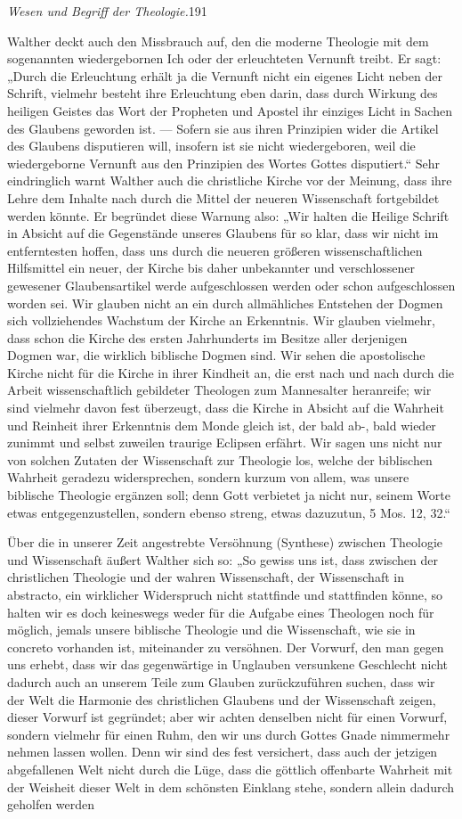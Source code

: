 \textsl{Wesen und Begriff der Theologie.}\hfill 191\par Walther deckt auch den Missbrauch auf, den die moderne Theologie mit dem sogenannten wiedergebornen Ich oder der erleuchteten Vernunft treibt. Er sagt: „Durch die Erleuchtung erhält ja die Vernunft nicht ein eigenes Licht neben der Schrift, vielmehr besteht ihre Erleuchtung eben darin, dass durch Wirkung des heiligen Geistes das Wort der Propheten und Apostel ihr einziges Licht in Sachen des Glaubens geworden ist. — Sofern sie aus ihren Prinzipien wider die Artikel des Glaubens disputieren will, insofern ist sie nicht wiedergeboren, weil die wiedergeborne Vernunft aus den Prinzipien des Wortes Gottes disputiert.“ Sehr eindringlich warnt Walther auch die christliche Kirche vor der Meinung, dass ihre Lehre dem Inhalte nach durch die Mittel der neueren Wissenschaft fortgebildet werden könnte. Er begründet diese Warnung also: „Wir halten die Heilige Schrift in Absicht auf die Gegenstände unseres Glaubens für so klar, dass wir nicht im entferntesten hoffen, dass uns durch die neueren größeren wissenschaftlichen Hilfsmittel ein neuer, der Kirche bis daher unbekannter und verschlossener gewesener Glaubensartikel werde aufgeschlossen werden oder schon aufgeschlossen worden sei. Wir glauben nicht an ein durch allmähliches Entstehen der Dogmen sich vollziehendes Wachstum der Kirche an Erkenntnis. Wir glauben vielmehr, dass schon die Kirche des ersten Jahrhunderts im Besitze aller derjenigen Dogmen war, die wirklich biblische Dogmen sind. Wir sehen die apostolische Kirche nicht für die Kirche in ihrer Kindheit an, die erst nach und nach durch die Arbeit wissenschaftlich gebildeter Theologen zum Mannesalter heranreife; wir sind vielmehr davon fest überzeugt, dass die Kirche in Absicht auf die Wahrheit und Reinheit ihrer Erkenntnis dem Monde gleich ist, der bald ab-, bald wieder zunimmt und selbst zuweilen traurige Eclipsen erfährt. Wir sagen uns nicht nur von solchen Zutaten der Wissenschaft zur Theologie los, welche der biblischen Wahrheit geradezu widersprechen, sondern kurzum von allem, was unsere biblische Theologie ergänzen soll; denn Gott verbietet ja nicht nur, seinem Worte etwas entgegenzustellen, sondern ebenso streng, etwas dazuzutun, 5 Mos. 12, 32.“\par Über die in unserer Zeit angestrebte Versöhnung (Synthese) zwischen Theologie und Wissenschaft äußert Walther sich so: „So gewiss uns ist, dass zwischen der christlichen Theologie und der wahren Wissenschaft, der Wissenschaft in abstracto, ein wirklicher Widerspruch nicht stattfinde und stattfinden könne, so halten wir es doch keineswegs weder für die Aufgabe eines Theologen noch für möglich, jemals unsere biblische Theologie und die Wissenschaft, wie sie in concreto vorhanden ist, miteinander zu versöhnen. Der Vorwurf, den man gegen uns erhebt, dass wir das gegenwärtige in Unglauben versunkene Geschlecht nicht dadurch auch an unserem Teile zum Glauben zurückzuführen suchen, dass wir der Welt die Harmonie des christlichen Glaubens und der Wissenschaft zeigen, dieser Vorwurf ist gegründet; aber wir achten denselben nicht für einen Vorwurf, sondern vielmehr für einen Ruhm, den wir uns durch Gottes Gnade nimmermehr nehmen lassen wollen. Denn wir sind des fest versichert, dass auch der jetzigen abgefallenen Welt nicht durch die Lüge, dass die göttlich offenbarte Wahrheit mit der Weisheit dieser Welt in dem schönsten Einklang stehe, sondern allein dadurch geholfen werden